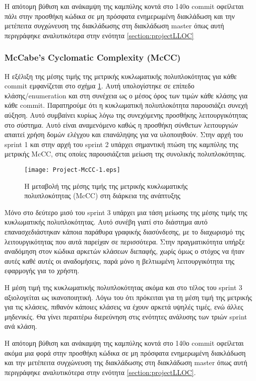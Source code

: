Η απότομη βύθιση και ανάκαμψη της καμπύλης κοντά στο 140ο commit
οφείλεται πάλι στην προσθήκη κώδικα σε μη πρόσφατα ενημερωμένη
διακλάδωση και την μετέπειτα συγχώνευση της διακλάδωσης στη
διακλάδωση master όπως αυτή περιγράφηκε αναλυτικότερα
στην ενότητα \ref{section:projectLLOC}

\subsubsection{McCabe's Cyclomatic Complexity (McCC)}

Η εξέλιξη της μέσης τιμής της μετρικής κυκλωματικής πολυπλοκότητας για
κάθε commit εμφανίζεται στο σχήμα \ref{fig:projectMcCC}. Αυτή υπολογίστηκε σε
επίπεδο κλάσης/enumeration και στη συνέχεια ως ο μέσος όρος των τιμών
κάθε κλάσης για κάθε commit. Παρατηρούμε ότι η κυκλωματική πολυπλοκότητα
παρουσιάζει συνεχή αύξηση. Αυτό συμβαίνει κυρίως λόγω της συνεχόμενης
προσθήκης λειτουργικότητας στο σύστημα. Αυτό είναι αναμενόμενο καθώς η
προσθήκη σύνθετων λειτουργιών απαιτεί χρήση δομών ελέγχου και επανάληψης
για να υλοποιηθούν. Στην αρχή του sprint 1 και στην αρχή του sprint 2
υπάρχει σημαντική πτώση της καμπύλης της μετρικής McCC, στις οποίες
παρουσιάζεται μείωση της συνολικής πολυπλοκότητας.

\begin{figure}
\centering
\texttt{[image: Project-McCC-1.eps]}
\caption{Η μεταβολή της μέσης τιμής της μετρικής κυκλωματικής
	πολυπλοκότητας (McCC) στη διάρκεια της ανάπτυξης}
\label{fig:projectMcCC}
\end{figure}

Μόνο στο δεύτερο μισό του sprint 3 υπάρχει μια τάση μείωσης της μέσης
τιμής της κυκλωματικής πολυπλοκότητας. Αυτό συνέβη γιατί στο διάστημα
αυτό επανασχεδιάστηκαν κάποια παράθυρα γραφικής διασύνδεσης, με το
διαχωρισμό της λειτουργικότητας που αυτά παρείχαν σε περισσότερα. Στην
πραγματικότητα υπήρξε αναδόμηση στον κώδικα αρκετών κλάσεων διεπαφής,
χωρίς όμως ο στόχος να ήταν αυτές καθέ αυτές οι αναδομήσεις, παρά μόνο η
βελτιωμένη λειτουργικότητα της εφαρμογής για το χρήστη.

Η μέση τιμή της κυκλωματικής πολυπλοκότητας ακόμα και στο τέλος του
sprint 3 αξιολογείται ως ικανοποιητική. Λόγω του ότι πρόκειται για τη
μέση τιμή της μετρικής για τις κλάσεις, πιθανόν κάποιες κλάσεις να έχουν
αρκετά υψηλές τιμές, ενώ άλλες μηδενικές. Θα γίνει περαιτέρω διερεύνηση
στις ενότητες ανάλυσης των τριών sprint ανά κλάση.

Η απότομη βύθιση και ανάκαμψη της καμπύλης κοντά στο 140ο commit
οφείλεται ακόμα μια φορά στην προσθήκη κώδικα σε μη πρόσφατα ενημερωμένη
διακλάδωση και την μετέπειτα συγχώνευση της διακλάδωσης στη διακλάδωση
master όπως αυτή περιγράφηκε αναλυτικότερα στην ενότητα
\ref{section:projectLLOC}.

